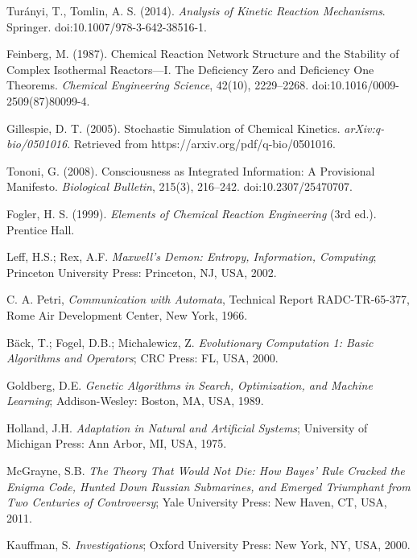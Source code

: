 \documentclass[preprint,12pt]{elsarticle}
\begin{document}
\begin{thebibliography}{999}
Turányi, T., Tomlin, A. S. (2014). \textit{Analysis of Kinetic Reaction Mechanisms}. Springer. doi:10.1007/978-3-642-38516-1.

Feinberg, M. (1987). Chemical Reaction Network Structure and the Stability of Complex Isothermal Reactors—I. The Deficiency Zero and Deficiency One Theorems. \textit{Chemical Engineering Science}, 42(10), 2229–2268. doi:10.1016/0009-2509(87)80099-4.

Gillespie, D. T. (2005). Stochastic Simulation of Chemical Kinetics. \textit{arXiv:q-bio/0501016}. Retrieved from https://arxiv.org/pdf/q-bio/0501016.

Tononi, G. (2008). Consciousness as Integrated Information: A Provisional Manifesto. \textit{Biological Bulletin}, 215(3), 216–242. doi:10.2307/25470707.

Fogler, H. S. (1999). \textit{Elements of Chemical Reaction Engineering} (3rd ed.). Prentice Hall.

Leff, H.S.; Rex, A.F. \textit{Maxwell’s Demon: Entropy, Information, Computing}; Princeton University Press: Princeton, NJ, USA, 2002.

 C. A. Petri, \textit{Communication with Automata}, Technical Report RADC-TR-65-377, Rome Air Development Center, New York, 1966.

Bäck, T.; Fogel, D.B.; Michalewicz, Z. \textit{Evolutionary Computation 1: Basic Algorithms and Operators}; CRC Press: FL, USA, 2000.

Goldberg, D.E. \textit{Genetic Algorithms in Search, Optimization, and Machine Learning}; Addison-Wesley: Boston, MA, USA, 1989.

Holland, J.H. \textit{Adaptation in Natural and Artificial Systems}; University of Michigan Press: Ann Arbor, MI, USA, 1975.

McGrayne, S.B. \textit{The Theory That Would Not Die: How Bayes' Rule Cracked the Enigma Code, Hunted Down Russian Submarines, and Emerged Triumphant from Two Centuries of Controversy}; Yale University Press: New Haven, CT, USA, 2011.

Kauffman, S. \textit{Investigations}; Oxford University Press: New York, NY, USA, 2000.


\end{thebibliography}
\end{document}
